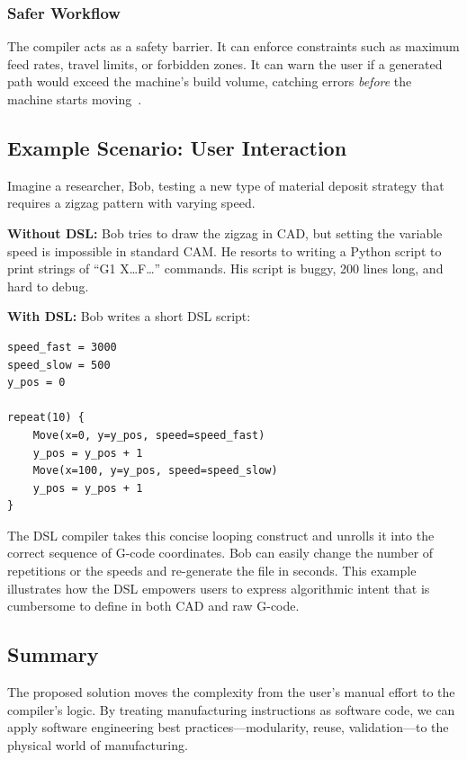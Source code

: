 \subsubsection{Safer Workflow}
The compiler acts as a safety barrier. It can enforce constraints such as maximum feed rates, travel limits, or forbidden zones. It can warn the user if a generated path would exceed the machine's build volume, catching errors \textit{before} the machine starts moving~\cite{noauthor_auto-seg_2026}.

\subsection{Example Scenario: User Interaction}

Imagine a researcher, Bob, testing a new type of material deposit strategy that requires a zigzag pattern with varying speed.

\textbf{Without DSL:} Bob tries to draw the zigzag in CAD, but setting the variable speed is impossible in standard CAM. He resorts to writing a Python script to print strings of ``G1 X\dots F\dots'' commands. His script is buggy, 200 lines long, and hard to debug.

\textbf{With DSL:} Bob writes a short DSL script:

\begin{verbatim}
speed_fast = 3000
speed_slow = 500
y_pos = 0

repeat(10) {
    Move(x=0, y=y_pos, speed=speed_fast)
    y_pos = y_pos + 1
    Move(x=100, y=y_pos, speed=speed_slow)
    y_pos = y_pos + 1
}
\end{verbatim}

The DSL compiler takes this concise looping construct and unrolls it into the correct sequence of G-code coordinates. Bob can easily change the number of repetitions or the speeds and re-generate the file in seconds. This example illustrates how the DSL empowers users to express algorithmic intent that is cumbersome to define in both CAD and raw G-code.

\subsection{Summary}
The proposed solution moves the complexity from the user's manual effort to the compiler's logic. By treating manufacturing instructions as software code, we can apply software engineering best practices—modularity, reuse, validation—to the physical world of manufacturing.

